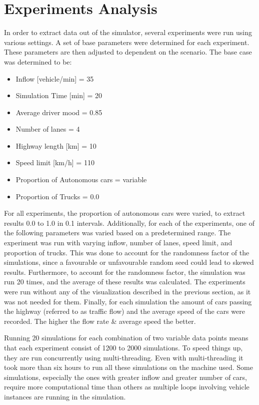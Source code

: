 \newpage
\section{Experiments Analysis}
In order to extract data out of the simulator, several experiments were run using various settings. A set of base parameters were determined for each experiment. These parameters are then adjusted to dependent on the scenario.
The base case was determined to be:
\begin{itemize}
    \item Inflow [vehicle/min] = 35 \cite{Green2020GuideTT}
    \item Simulation Time [min] = 20
    \item Average driver mood = 0.85
    \item Number of lanes = 4
    \item Highway length [km] = 10
    \item Speed limit [km/h] = 110
    \item Proportion of Autonomous cars = variable
    \item Proportion of Trucks = 0.0 %
\end{itemize}
For all experiments, the proportion of autonomous cars were varied, to extract results 0.0 to 1.0 in 0.1 intervals. Additionally, for each of the experiments, one of the following parameters was varied based on a predetermined range. The experiment was run with varying inflow, number of lanes, speed limit, and proportion of trucks. This was done to account for the randomness factor of the simulations, since a favourable or unfavourable random seed could lead to skewed results. Furthermore, to account for the randomness factor, the simulation was run 20 times, and the average of these results was calculated. 
The experiments were run without any of the visualization described in the previous section, as it was not needed for them. Finally, for each simulation the amount of cars passing the highway (referred to as traffic flow) and the average speed of the cars were recorded. The higher the flow rate \& average speed the better. 

Running 20 simulations for each combination of two variable data points means that each experiment consist of 1200 to 2000 simulations. To speed things up, they are run concurrently using multi-threading. Even with multi-threading it took more than six hours to run all these simulations on the machine used. Some simulations, especially the ones with greater inflow and greater number of cars, require more computational time than others as multiple loops involving vehicle instances are running in the simulation.

